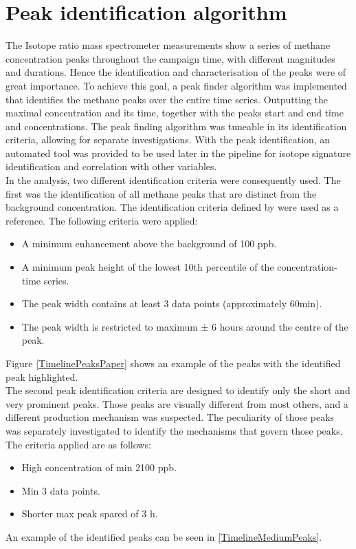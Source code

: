 \section{Peak identification algorithm}
The Isotope ratio mass spectrometer measurements show a series of methane concentration peaks throughout the campaign time, with different magnitudes and durations. Hence the identification and characterisation of the peaks were of great importance. To achieve this goal, a peak finder algorithm was implemented that identifies the methane peaks over the entire time series. Outputting the maximal concentration and its time, together with the peaks start and end time and concentrations. The peak finding algorithm was tuneable in its identification criteria, allowing for separate investigations. With the peak identification, an automated tool was provided to be used later in the pipeline for isotope signature identification and correlation with other variables.\\
In the analysis, two different identification criteria were consequently used. The first was the identification of all methane peaks that are distinct from the background concentration. The identification criteria defined by \cite{Menoud.2021} were used as a reference. The following criteria were applied:
\begin{itemize}
  \item A minimum enhancement above the background of 100 ppb.
  \item A minimum peak height of the lowest 10th percentile of the concentration-time series.
  \item The peak width contains at least 3 data points (approximately 60min).
  \item The peak width is restricted to maximum ± 6 hours around the centre of the peak.
\end{itemize}
Figure \cref{TimelinePeaksPaper} shows an example of the peaks with the identified peak highlighted.\\
The second peak identification criteria are designed to identify only the short and very prominent peaks. Those peaks are visually different from most others, and a different production mechanism was suspected. The peculiarity of those peaks was separately investigated to identify the mechanisms that govern those peaks. The criteria applied are as follows:
\begin{itemize}
  \item High concentration of min 2100 ppb.
  \item Min 3 data points.
  \item Shorter max peak spared of 3 h.
\end{itemize}
An example of the identified peaks can be seen in \cref{TimelineMediumPeaks}. 

